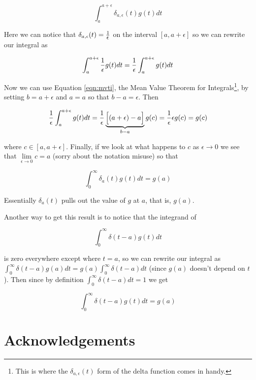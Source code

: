 \documentclass{article}
\begin{document}
\begin{equation*}
  \int_{a}^{a + \epsilon} \delta_{a,\epsilon}(t) g(t) dt
\end{equation*}

\bigskip
\noindent
Here we can notice that $ \delta_{a,\epsilon}(t) = \frac{1}{\mathlarger{\epsilon}}$ on the interval $[a, a+\epsilon]$ so we can rewrite our integral as 

\bigskip
\begin{equation*}
  \int_{a}^{a + \epsilon} \frac{1}{\mathlarger{\epsilon}} g(t) dt =  \frac{1}{\mathlarger{\epsilon}} \int_{a}^{a + \epsilon} g(t) dt
\end{equation*}

\bigskip
\noindent
Now we can use Equation \ref{eqn:mvti}, the Mean Value Theorem for Integrals\footnote{This is where the $\delta_{a,\epsilon}(t)$ form of the delta function comes in handy.},
by setting $b = a + \epsilon$ and $a = a$ so that $b - a = \epsilon$. Then 

\bigskip
\begin{equation*}
 \frac{1}{\mathlarger{\epsilon}} \int_{a}^{a + \epsilon} g(t) dt =  \frac{1}{\mathlarger{\epsilon}} \underbrace{ \Big [(a + \epsilon) - a \Big]}_{b -a} g(c) = \frac{1}{\mathlarger{\epsilon}} \epsilon g(c) = g(c)
\end{equation*}

\bigskip
\noindent
where $c \in [a, a + \epsilon]$. Finally, if we look at what happens to $c$ as $\epsilon \to 0$ we see that $\lim\limits_{\epsilon \to 0} c = a$ (sorry about the notation misuse)
so that 


\begin{equation}
  \int_{0}^{\infty} \delta_{a}(t) g(t) dt = g(a)
  \label{eqn:g(a)}
\end{equation}

\bigskip
\noindent
Essentially $\delta_{a}(t)$ pulls out the value of $g$ at $a$, that is, $g(a)$.

\bigskip
\noindent
Another way to get this result \cite{youtube:suskind2008.4} is to notice that the integrand of 

\bigskip
\begin{equation*}
  \int_{0}^{\infty} \delta (t-a) g(t) dt
\end{equation*}

\bigskip
\noindent
is zero everywhere except where $t = a$, so we can rewrite our integral as
 $\int_{0}^{\infty} \delta (t-a) g(a) dt = g(a) \int_{0}^{\infty} \delta (t-a) dt$ (since $g(a)$ doesn't depend on $t$). 
 Then since by definition $ \int_{0}^{\infty} \delta (t-a) dt = 1$ we get

\bigskip
\begin{equation*}
  \int_{0}^{\infty} \delta (t-a) g(t) dt = g(a)
\end{equation*}
\section*{Acknowledgements}

\newpage


\end{document}
